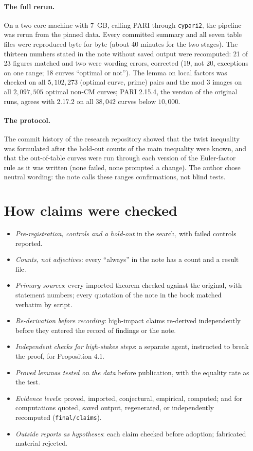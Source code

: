\documentclass[11pt,a4paper]{article}
\begin{document}
\paragraph{The full rerun.} On a two-core machine with 7~GB, calling PARI through \texttt{cypari2}, the pipeline was rerun from the pinned data. Every committed summary and all seven table files were reproduced byte for byte (about 40 minutes for the two stages). The thirteen numbers stated in the note without saved output were recomputed: 21 of 23 figures matched and two were wording errors, corrected (19, not 20, exceptions on one range; 18 curves ``optimal or not''). The lemma on local factors was checked on all $5{,}102{,}273$ (optimal curve, prime) pairs and the mod $3$ images on all $2{,}097{,}505$ optimal non-CM curves; PARI 2.15.4, the version of the original runs, agrees with 2.17.2 on all $38{,}042$ curves below $10{,}000$.

\paragraph{The protocol.} The commit history of the research repository showed that the twist inequality was formulated after the hold-out counts of the main inequality were known, and that the out-of-table curves were run through each version of the Euler-factor rule as it was written (none failed, none prompted a change). The author chose neutral wording: the note calls these ranges confirmations, not blind tests.

\section{How claims were checked}
\begin{itemize}
\item \emph{Pre-registration, controls and a hold-out} in the search, with failed controls reported.
\item \emph{Counts, not adjectives}: every ``always'' in the note has a count and a result file.
\item \emph{Primary sources}: every imported theorem checked against the original, with statement numbers; every quotation of the note in the book matched verbatim by script.
\item \emph{Re-derivation before recording}: high-impact claims re-derived independently before they entered the record of findings or the note.
\item \emph{Independent checks for high-stakes steps}: a separate agent, instructed to break the proof, for Proposition 4.1.
\item \emph{Proved lemmas tested on the data} before publication, with the equality rate as the test.
\item \emph{Evidence levels}: proved, imported, conjectural, empirical, computed; and for computations quoted, saved output, regenerated, or independently recomputed (\texttt{final/claims}).
\item \emph{Outside reports as hypotheses}: each claim checked before adoption; fabricated material rejected.
\end{itemize}
\end{document}
